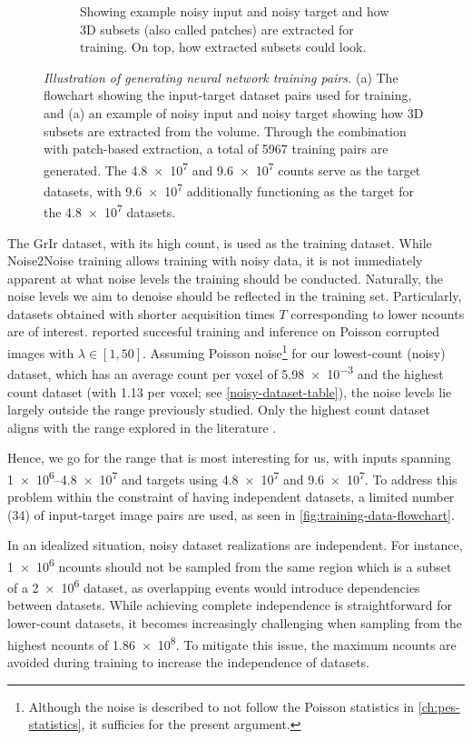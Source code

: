 \begin{figure}[h]
\begin{subfigure}[t]{0.39\linewidth}
        \caption{Showing example noisy input and noisy target and how 3D subsets (also called patches) are extracted for training. On top, how extracted subsets could look.}
        \label{fig:training-3d-patch-example}
    \end{subfigure}
    \caption{\textit{Illustration of generating neural network training pairs.} (a) The flowchart showing the input-target dataset pairs used for training, and (a) an example of noisy input and noisy target showing how 3D subsets are extracted from the volume. Through the combination with patch-based extraction, a total of \num{5967} training pairs are generated. The \num{4.8e7} and \num{9.6e7} counts serve as the target datasets, with \num{9.6e7} additionally functioning as the target for the \num{4.8e7} datasets.}
\end{figure}
The \gls{GrIr} dataset, with its high count, is used as the training dataset. While Noise2Noise training allows training with noisy data, it is not immediately apparent at what noise levels the training should be conducted. Naturally, the noise levels we aim to denoise should be reflected in the training set. Particularly, datasets obtained with shorter acquisition times $T$ corresponding to lower \gls{ncounts} are of interest. \citeauthor{lehtinenNoise2NoiseLearningImage2018} reported succesful training and inference on Poisson corrupted images with $\lambda \in [1, 50]$. Assuming Poisson noise\footnote{Although the noise is described to not follow the Poisson statistics in \cref{ch:pes-statistics}, it sufficies for the present argument.} for our lowest-count (noisy) dataset, which has an average count per voxel of \num{5.98e-3} and the highest count dataset (with \num{1.13} per voxel; see \cref{noisy-dataset-table}), the noise levels lie largely outside the range previously studied. Only the highest count dataset aligns with the range explored in the literature \cite{lehtinenNoise2NoiseLearningImage2018}.

Hence, we go for the range that is most interesting for us, with inputs spanning \numrange{1e6}{4.8e7} and targets using \num{4.8e7} and \num{9.6e7}. To address this problem within the constraint of having independent datasets, a limited number (\num{34}) of input-target image pairs are used, as seen in \cref{fig:training-data-flowchart}. 

In an idealized situation, noisy dataset realizations are independent. For instance, \num{1e6} \gls{ncounts} should not be sampled from the same region which is a subset of a \num{2e6} dataset, as overlapping events would introduce dependencies between datasets. While achieving complete independence is straightforward for lower-count datasets, it becomes increasingly challenging when sampling from the highest \gls{ncounts} of \num{1.86e8}. To mitigate this issue, the maximum \gls{ncounts} are avoided during training to increase the independence of datasets. 

